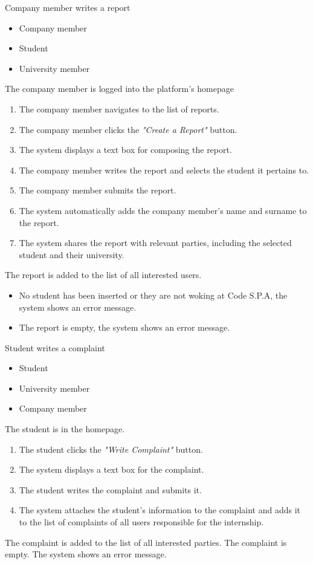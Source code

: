 \usecase
{Company member writes a report}
{\begin{itemize}
    \item Company member
    \item Student
    \item University member
\end{itemize}}
{The company member is logged into the platform's homepage}
{
    \begin{enumerate}
        \item The company member navigates to the list of reports.
        \item The company member clicks the \textit{"Create a Report"} button.
        \item The system displays a text box for composing the report.
        \item The company member writes the report and selects the student it pertains to.
        \item The company member submits the report.
        \item The system automatically adds the company member's name and surname to the report.
        \item The system shares the report with relevant parties, including the selected student and their university.
    \end{enumerate}
}
{The report is added to the list of all interested users.}
{\begin{itemize}
    \item No student has been inserted or they are not woking at Code S.P.A, the system shows an error message.
    \item The report is empty, the system shows an error message.
\end{itemize}}
{}


\usecase
{Student writes a complaint}
{\begin{itemize}
    \item Student
    \item University member
    \item Company member
\end{itemize}}
{The student is in the homepage.}
{
    \begin{enumerate}
        \item The student clicks the \textit{"Write Complaint"} button.
        \item The system displays a text box for the complaint.
        \item The student writes the complaint and submits it.
        \item The system attaches the student's information to the complaint and adds it to the list of complaints of all users responsible for the internship. 
    \end{enumerate}
}
{The complaint is added to the list of all interested parties.}
{
The complaint is empty. The system shows an error message.
}
{}
{}

